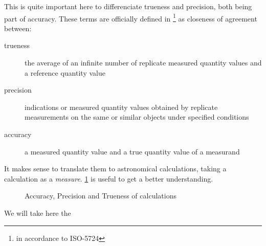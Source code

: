 

This is quite important here to differenciate trueness and precision, both being part of accuracy. These terms are officially defined in \cite{VIM}\footnote{in accordance to ISO-5724\cite{ISO5725}} as closeness of agreement between:

\begin{description}
\item[trueness] the average of an infinite number of replicate measured quantity values and a reference quantity value
\item[precision] indications or measured quantity values obtained by replicate measurements on the same or similar objects under specified conditions
\item[accuracy] a measured quantity value and a true quantity value of a measurand
\end{description}

It makes sense to translate them to astronomical calculations, taking a calculation as a \emph{measure}. \ref{ATP} is useful to get a better understanding.

\begin{figure}[h]
\centering
\def\svgwidth{10cm}

\label{ATP}
\caption{Accuracy, Precision and Trueness of calculations}
\end{figure}


We will take here the 




